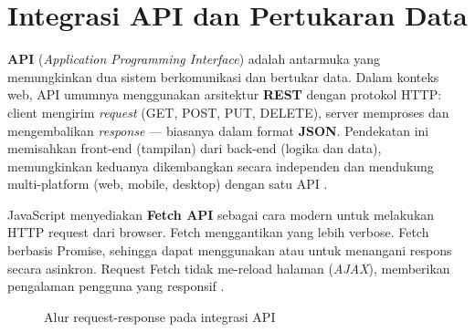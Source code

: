 ﻿\section{Integrasi API dan Pertukaran Data}

\textbf{API} (\textit{Application Programming Interface}) adalah antarmuka yang memungkinkan dua sistem berkomunikasi dan bertukar data. Dalam konteks web, API umumnya menggunakan arsitektur \textbf{REST} dengan protokol HTTP: client mengirim \textit{request} (GET, POST, PUT, DELETE), server memproses dan mengembalikan \textit{response} --- biasanya dalam format \textbf{JSON}. Pendekatan ini memisahkan front-end (tampilan) dari back-end (logika dan data), memungkinkan keduanya dikembangkan secara independen dan mendukung multi-platform (web, mobile, desktop) dengan satu API \cite{mdnJsGuide}.

JavaScript menyediakan \textbf{Fetch API} sebagai cara modern untuk melakukan HTTP request dari browser. Fetch menggantikan  yang lebih verbose. Fetch berbasis Promise, sehingga dapat menggunakan  atau  untuk menangani respons secara asinkron. Request Fetch tidak me-reload halaman (\textit{AJAX}), memberikan pengalaman pengguna yang responsif \cite{mdnJsGuide}.

\begin{figure}[H]
\centering
{}
\caption{Alur request-response pada integrasi API}
\end{figure}

